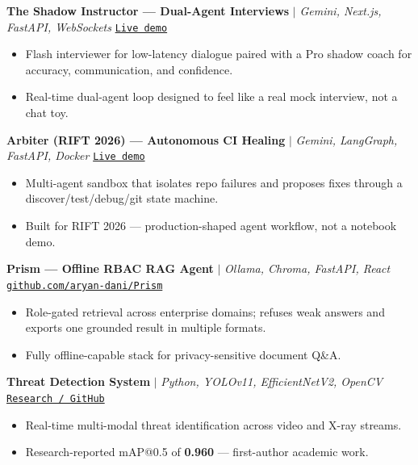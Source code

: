 \documentclass[a4paper,10pt]{article}
\begin{document}
\vspace{5pt}
\noindent
\textbf{The Shadow Instructor --- Dual-Agent Interviews} $|$ \textit{Gemini, Next.js, FastAPI, WebSockets}
\hfill \texttt{\href{https://the-shadow-instructor.vercel.app/}{Live demo}}
\begin{itemize}
  \item Flash interviewer for low-latency dialogue paired with a Pro shadow coach for accuracy, communication, and confidence.
  \item Real-time dual-agent loop designed to feel like a real mock interview, not a chat toy.
\end{itemize}

\vspace{5pt}
\noindent
\textbf{Arbiter (RIFT 2026) --- Autonomous CI Healing} $|$ \textit{Gemini, LangGraph, FastAPI, Docker}
\hfill \texttt{\href{https://thearbiter.vercel.app/}{Live demo}}
\begin{itemize}
  \item Multi-agent sandbox that isolates repo failures and proposes fixes through a discover/test/debug/git state machine.
  \item Built for RIFT 2026 --- production-shaped agent workflow, not a notebook demo.
\end{itemize}

\vspace{5pt}
\noindent
\textbf{Prism --- Offline RBAC RAG Agent} $|$ \textit{Ollama, Chroma, FastAPI, React}
\hfill \texttt{\href{https://github.com/aryan-dani/Prism}{github.com/aryan-dani/Prism}}
\begin{itemize}
  \item Role-gated retrieval across enterprise domains; refuses weak answers and exports one grounded result in multiple formats.
  \item Fully offline-capable stack for privacy-sensitive document Q\&A.
\end{itemize}

\vspace{5pt}
\noindent
\textbf{Threat Detection System} $|$ \textit{Python, YOLOv11, EfficientNetV2, OpenCV}
\hfill \texttt{\href{https://github.com/aryan-dani}{Research / GitHub}}
\begin{itemize}
  \item Real-time multi-modal threat identification across video and X-ray streams.
  \item Research-reported mAP@0.5 of \textbf{0.960} --- first-author academic work.
\end{itemize}
\end{document}
